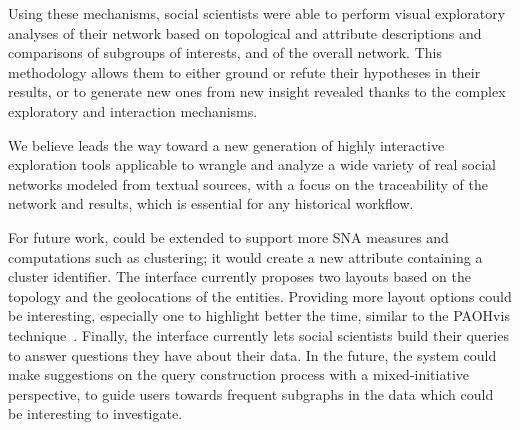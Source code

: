 Using these mechanisms, social scientists were able to perform visual exploratory analyses of their network based on topological and attribute descriptions and comparisons of subgroups of interests, and of the overall network.
This methodology allows them to either ground or refute their hypotheses in their results, or to generate new ones from new insight revealed thanks to the complex exploratory and interaction mechanisms.

We believe \name leads the way toward a new generation of highly interactive exploration tools applicable to wrangle and analyze a wide variety of real social networks modeled from textual sources, with a focus on the traceability of the network and results, which is essential for any historical workflow.

For future work, \name could be extended to support more SNA measures and computations such as clustering; it would create a new attribute containing a cluster identifier.
The interface currently proposes two layouts based on the topology and the geolocations of the entities.
Providing more layout options could be interesting, especially one to highlight better the time, similar to the PAOHvis technique~\cite{valdiviaAnalyzingDynamicHypergraphs2021}.
Finally, the interface currently lets social scientists build their queries to answer questions they have about their data.
In the future, the system could make suggestions on the query construction process with a mixed-initiative perspective, to guide users towards frequent subgraphs in the data which could be interesting to investigate.







